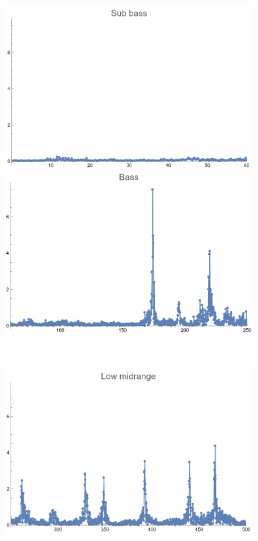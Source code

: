 \documentclass[12pt, letterpaper]{article}
\begin{document}
\begin{figure}[H]
  \centering
  \begin{minipage}{.3\textwidth}
    \centering
    \includegraphics[width=.9\linewidth]{imgs/Cancion7/subbass.png}
  \end{minipage}
  \begin{minipage}{0.03\textwidth}\end{minipage}
  \begin{minipage}{.3\textwidth}
    \centering
    \includegraphics[width=.9\linewidth]{imgs/Cancion7/bass.png}
  \end{minipage} \medskip \\
  \begin{minipage}{.3\textwidth}
    \centering
    \includegraphics[width=.9\linewidth]{imgs/Cancion7/lowmid.png}

\end{minipage}
\end{figure}
\end{document}
